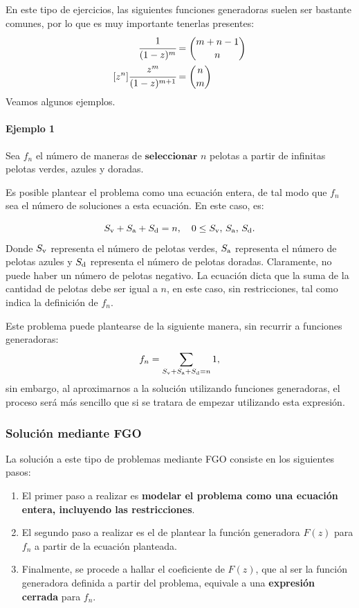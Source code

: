 En este  tipo de ejercicios, las siguientes funciones generadoras suelen ser bastante comunes, por lo que es muy importante tenerlas presentes:
\begin{align*}
[z^n]\cfrac{1}{(1-z)^m}&=\binom{m+n-1}{n}\\
[z^n]\cfrac{z^{m}}{(1-z)^{m+1}}&=\binom{n}{m}\\
\end{align*}
Veamos algunos ejemplos.

\paragraph{Ejemplo 1}
Sea $f_n$ el número de maneras de $\textbf{seleccionar}$ $n$ pelotas a partir de infinitas pelotas verdes, azules y doradas.

Es posible plantear el problema como una ecuación entera, de tal modo que $f_n$ sea el número de soluciones a esta ecuación. En este caso, es:

$$S_{\rm v}+S_{\rm a} + S_{\rm d}=n,\quad 0\leq S_{\rm v},\,S_{\rm a},\,S_{\rm d}.$$
Donde $S_{\rm v}$ representa el número de pelotas verdes, $S_{\rm a}$  representa el número de pelotas azules y $S_{\rm d}$ representa el número de pelotas doradas. Claramente, no puede haber un número de pelotas negativo. La ecuación dicta que la suma de la cantidad de pelotas debe ser igual a $n$, en este caso, sin restricciones, tal como indica la definición de $f_n$.

Este problema puede plantearse de la siguiente manera, sin recurrir a funciones generadoras:
$$f_n=\sum_{S_{\rm v}+S_{\rm a} + S_{\rm d}=n}{1},$$
sin embargo, al aproximarnos a la solución utilizando funciones generadoras, el proceso será más sencillo que si se tratara de empezar utilizando esta expresión.

\subsubsection*{Solución mediante FGO}
La solución a este tipo de problemas mediante FGO consiste en los siguientes pasos:

\begin{enumerate}
	\item El primer paso a realizar es \textbf{modelar el problema como una ecuación entera, incluyendo las restricciones}. 
	\item El segundo paso a realizar es el de plantear la función generadora $F(z)$ para $f_n$ a partir de la ecuación planteada.
	\item Finalmente, se procede a hallar el coeficiente de $F(z)$, que al ser la función generadora definida a partir del problema, equivale a una \textbf{expresión cerrada} para $f_n$.
\end{enumerate}



